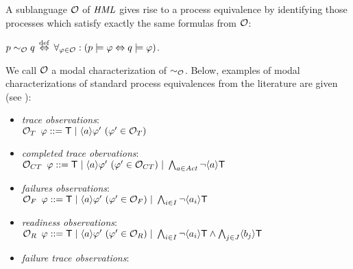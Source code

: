 \documentclass{eptcs}
\def\hmo{{\cal O}}
\def\hml{{\it HML}}
\def\eqhmo{\sim_{\hmo}}
\def\hmeq{\sim_{\cal O}}
\def\iff{\Leftrightarrow}
\def\iffdef{\stackrel{\rm def}\Leftrightarrow}
\def\true{{\sf T}}
\newcommand{\diam}[1]{\langle#1\rangle}
\begin{document}
A sublanguage $\hmo$ of $\hml$ gives rise to a process equivalence by identifying those processes which satisfy exactly the same formulas from $\hmo$:
\begin{center}
$p \eqhmo q \,\iffdef\, \forall_{\varphi \in \hmo}: (p \models \varphi \iff q \models \varphi)$.
\end{center}
We call $\hmo$ a  modal characterization of $\hmeq$. Below, examples of modal characterizations of standard process equivalences from the literature are given (see \cite{Gla01}):
\begin{itemize}
	\item \textit{trace observations}:\\
	 $\hmo_{T} \hspace{5.0 pt} \varphi ::= \true \hspace{3.0 pt}|\hspace{3.0 pt} \diam{a} \varphi '~(\varphi' \in \hmo_{T})$
	\item \textit{completed trace obervations}:\\
	 $\hmo_{CT} \hspace{5.0 pt} \varphi ::= \true \hspace{3.0 pt}|\hspace{3.0 pt} \diam{a} \varphi '~(\varphi' \in \hmo_{CT})\hspace{3.0 pt}|\hspace{3.0 pt} \bigwedge_{a \in {\it Act}} \neg \diam{a} \true$
	\item \textit{failures observations}:\\
	 $\hmo_{F} \hspace{5.0 pt} \varphi ::= \true \hspace{3.0 pt}|\hspace{3.0 pt} \diam{a} \varphi '~(\varphi' \in \hmo_{F})\hspace{3.0 pt}|\hspace{3.0 pt} \bigwedge_{i \in I} \neg \diam{a_i} \true$
  \item \textit{readiness observations}:\\	 
	$\hmo_{R} \hspace{5.0 pt} \varphi ::= \true \hspace{3.0 pt}|\hspace{3.0 pt} \diam{a} \varphi '~(\varphi' \in \hmo_{R})\hspace{3.0 pt}|\hspace{3.0 pt} \bigwedge_{i \in I} \neg \diam{a_i} \true \wedge \bigwedge_{j \in J} \diam{b_j} \true$
	\item \textit{failure trace observations}:\\	 

\end{itemize}
\end{document}
